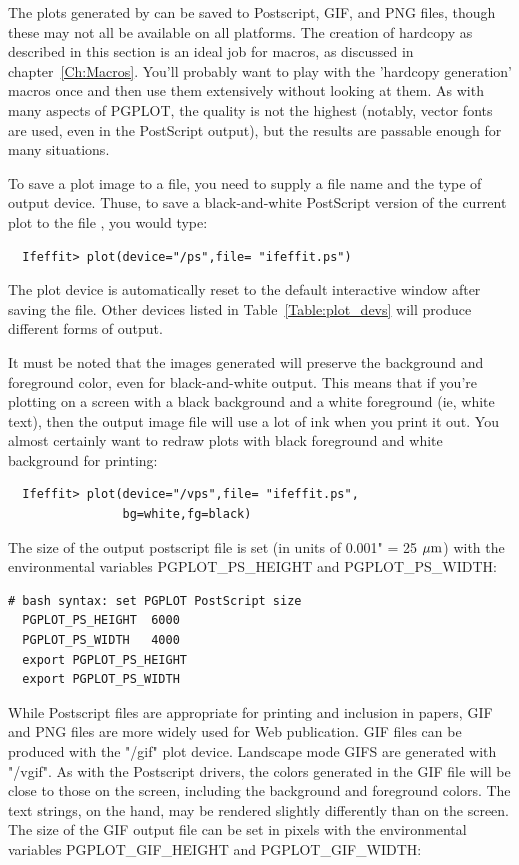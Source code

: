The plots generated by {\ifeffit} can be saved to Postscript, GIF, and PNG
files, though these may not all be available on all platforms.  The
creation of hardcopy as described in this section is an ideal job for
{\ifeffit} macros, as discussed in chapter~\ref{Ch:Macros}.  You'll
probably want to play with the 'hardcopy generation' macros once and then
use them extensively without looking at them.  As with many aspects of
PGPLOT, the quality is not the highest (notably, vector fonts are used,
even in the PostScript output), but the results are passable enough for
many situations.

To save a plot image to a file, you need to supply a file name and the type
of output device.  Thuse, to save a black-and-white PostScript version of the
current plot to the file {}, you would type:
\begin{verbatim}
  Ifeffit> plot(device="/ps",file= "ifeffit.ps")
\end{verbatim}
\noindent
The plot device is automatically reset to the default interactive window
after saving the file.  Other devices listed in
Table~{\ref{Table:plot_devs}} will produce different forms of output.

It must be noted that the images generated will preserve the background and
foreground color, even for black-and-white output.  This means that if
you're plotting on a screen with a black background and a white foreground
(ie, white text), then the output image file will use a lot of ink when you
print it out.  You almost certainly want to redraw plots with black
foreground and white background for printing:
\begin{verbatim}
  Ifeffit> plot(device="/vps",file= "ifeffit.ps",
                bg=white,fg=black)
\end{verbatim}
\noindent

The size of the output postscript file is set (in units of 0.001" = 25
$\rm{\mu}m$) with the environmental variables PGPLOT\_PS\_HEIGHT and
PGPLOT\_PS\_WIDTH:
\begin{verbatim}
# bash syntax: set PGPLOT PostScript size
  PGPLOT_PS_HEIGHT  6000
  PGPLOT_PS_WIDTH   4000
  export PGPLOT_PS_HEIGHT
  export PGPLOT_PS_WIDTH
\end{verbatim}
\noindent

While Postscript files are appropriate for printing and inclusion in
papers, GIF and PNG files are more widely used for Web publication.  GIF
files can be produced with the "/gif" plot device.  Landscape mode GIFS are
generated with "/vgif".  As with the Postscript drivers, the colors
generated in the GIF file will be close to those on the screen, including
the background and foreground colors.  The text strings, on the hand, may
be rendered slightly differently than on the screen.  The size of the GIF
output file can be set in pixels with the environmental variables
PGPLOT\_GIF\_HEIGHT and PGPLOT\_GIF\_WIDTH:

